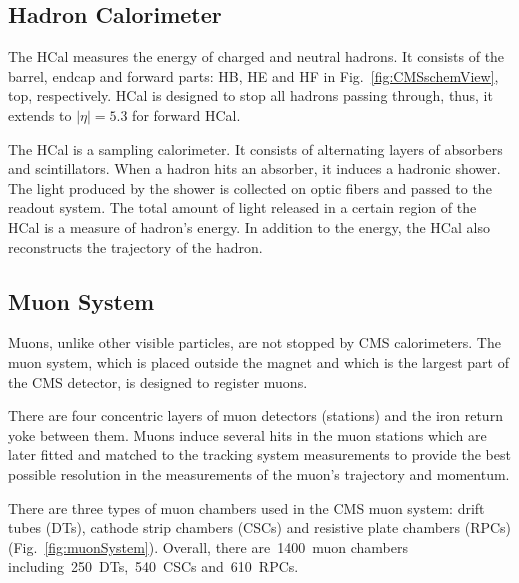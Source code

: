 

\subsection{Hadron Calorimeter}

The HCal measures the energy of charged and neutral hadrons. It consists of the barrel, endcap and forward parts: HB, HE and HF in Fig.~\ref{fig:CMSschemView}, top, respectively. HCal is designed to stop all hadrons passing through, thus, it extends to $|\eta|=5.3$ for forward HCal.

The HCal is a sampling calorimeter. It consists of alternating layers of absorbers and scintillators. When a hadron hits an absorber, it induces a hadronic shower. The light produced by the shower is collected on optic fibers and passed to the readout system. The total amount of light released in a certain region of the HCal is a measure of hadron's energy. In addition to the energy, the HCal also reconstructs the trajectory of the hadron.   

\subsection{Muon System}

Muons, unlike other visible particles, are not stopped by CMS calorimeters. The muon system, which is placed outside the magnet and which is the largest part of the CMS detector, is designed to register muons.

There are four concentric layers of muon detectors (stations) and the iron return yoke between them. Muons induce several hits in the muon stations which are later fitted and matched to the tracking system measurements to provide the best possible resolution in the measurements of the muon's trajectory and momentum.

There are three types of muon chambers used in the CMS muon system: drift tubes (DTs), cathode strip chambers (CSCs) and resistive plate chambers (RPCs) (Fig.~\ref{fig:muonSystem}). Overall, there are~1400~muon chambers including~250~DTs,~540~CSCs and~610~RPCs.

